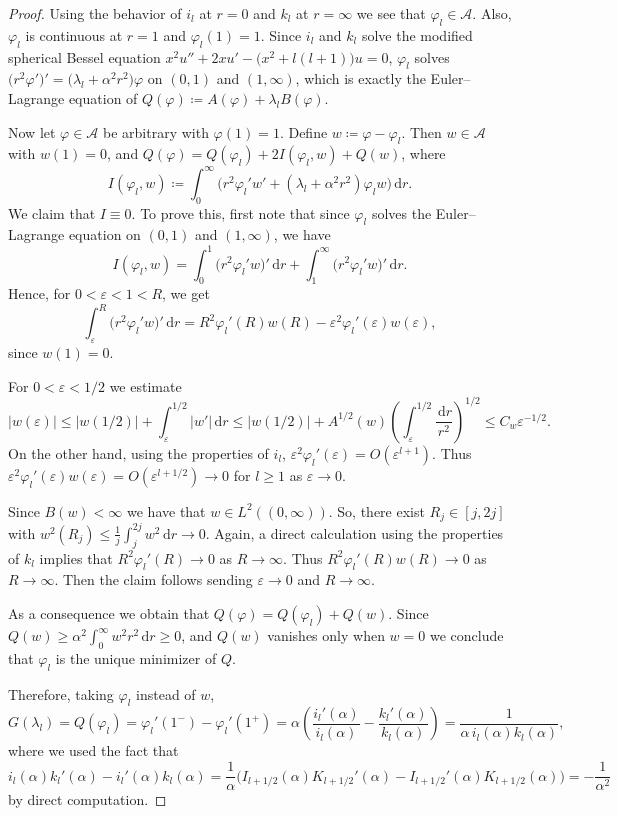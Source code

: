 \documentclass[a4paper,11pt,reqno]{amsart}
\numberwithin{equation}{section}
\theoremstyle{remark}
\theoremstyle{definition}
\newcommand{\e}{\varepsilon}
\newcommand{\dd}{\,\mathrm{d}}
\newcommand{\defeq}{\coloneqq}
\renewcommand{\leq}{\leqslant}
\renewcommand{\geq}{\geqslant}
\begin{document}
\begin{proof}
Using the behavior of $i_l$ at $r=0$ and $k_l$ at $r=\infty$ we see that $\varphi_l \in \mathscr{A}$. Also, $\varphi_l$ is continuous at $r=1$ and $\varphi_l(1)=1$. Since $i_l$ and $k_l$ solve the modified spherical Bessel equation $x^2u'' +2xu'-\big(x^2+l(l+1)\big)u=0$, $\varphi_l$ solves $\big(r^2\varphi'\big)'=\big(\lambda_l+\alpha^2r^2\big)\varphi$ on $(0,1)$ and $(1,\infty)$, which is exactly the Euler--Lagrange equation of $Q(\varphi)\defeq A(\varphi)+\lambda_l B(\varphi)$.

Now let $\varphi\in\mathscr{A}$ be arbitrary with $\varphi(1)=1$. Define $w\defeq\varphi-\varphi_l$. Then $w\in\mathscr{A}$ with $w(1)=0$, and $Q(\varphi)=Q(\varphi_l)+2I(\varphi_l,w)+Q(w)$, where
	\[
		I(\varphi_l,w) \defeq \int_0^\infty \big(r^2\varphi_l'w'+(\lambda_l+\alpha^2r^2)\varphi_l w\big)\dd r. 
	\]
We claim that $I \equiv 0$. To prove this, first note that since $\varphi_l$ solves the Euler--Lagrange equation on $(0,1)$ and $(1,\infty)$, we have
	\[
		I(\varphi_l,w) = \int_0^1 \big(r^2\varphi_l'w\big)'\dd r + \int_1^\infty \big(r^2\varphi_l'w\big)'\dd r.
	\]
Hence, for $0<\e<1<R$, we get
	\[
		\int_{\e}^R \big(r^2\varphi_l'w\big)'\dd r = R^2 \varphi_l'(R)w(R) - \e^2\varphi_l'(\e)w(\e),
	\]
since $w(1)=0$.

For $0<\e<1/2$ we estimate
	\[
		|w(\e)| \leq |w(1/2)| + \int_{\e}^{1/2} |w'|\dd r \leq |w(1/2)| + A^{1/2}(w)\left(\int_{\e}^{1/2}\frac{\dd r}{r^2}\right)^{1/2} \leq C_w \e^{-1/2}.
	\]
On the other hand, using the properties of $i_l$, $\e^2 \varphi_l'(\e)=O(\e^{l+1})$. Thus $\e^2\varphi_l'(\e)w(\e) = O(\e^{l+1/2})\to 0$ for $l\geq 1$ as $\e\to 0$.

Since $B(w)<\infty$ we have that $w\in L^2((0,\infty))$. So, there exist $R_j \in [j,2j]$ with $w^2(R_j) \leq \frac{1}{j}\int_j^{2j} w^2\dd r \to 0$. Again, a direct calculation using the properties of $k_l$ implies that $R^2\varphi_l'(R)\to 0$ as $R\to \infty$. Thus $R^2 \varphi_l'(R)w(R)\to 0$ as $R\to\infty$. Then the claim follows sending $\e\to 0$ and $R\to \infty$.

As a consequence we obtain that $Q(\varphi)=Q(\varphi_l)+Q(w)$. Since $Q(w) \geq \alpha^2\int_0^\infty w^2 r^2\dd r \geq 0$, and $Q(w)$ vanishes only when $w=0$ we conclude that $\varphi_l$ is the unique minimizer of $Q$.

Therefore, taking $\varphi_l$ instead of $w$,
	\[
		G(\lambda_l) = Q(\varphi_l) = \varphi_l'(1^-) - \varphi_l'(1^+) = \alpha \left(\frac{i_l'(\alpha)}{i_l(\alpha)}-\frac{k_l'(\alpha)}{k_l(\alpha)}\right) =\frac{1}{\alpha\,i_l(\alpha)k_l(\alpha)},
	\]
where we used the fact that 
	\[
		i_l(\alpha)k_l'(\alpha) - i_l'(\alpha)k_l(\alpha) = \frac{1}{\alpha}\big(I_{l+1/2}(\alpha)K_{l+1/2}'(\alpha) - I_{l+1/2}'(\alpha)K_{l+1/2}(\alpha)\big) = -\frac{1}{\alpha^2}
	\]
by direct computation.
\end{proof}
\end{document}
